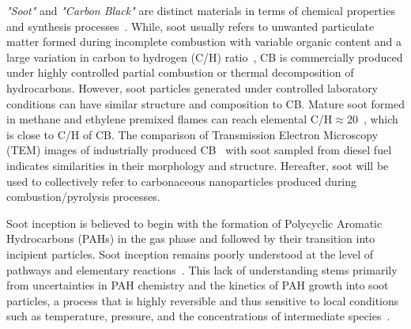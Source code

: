 \textit{"Soot"} and \textit{"Carbon Black"} are distinct materials in terms of chemical properties and synthesis processes~\cite{watson2001carbon}. While, soot usually refers to unwanted particulate matter formed during incomplete combustion with variable organic content and a large variation in carbon to hydrogen (C/H) ratio~\citep{watson2001carbon}, CB is commercially produced under highly controlled partial combustion or thermal decomposition of hydrocarbons. However, soot particles generated under controlled laboratory conditions can have similar structure and composition to CB. Mature soot formed in methane and ethylene premixed flames can reach elemental C/H$\approx$20~\cite{russo2015dehydrogenation}, which is close to C/H of CB. The comparison of Transmission Electron Microscopy (TEM) images of industrially produced CB~\citep{singh2018nanostructure} with soot sampled from diesel fuel~\citep{vander2007hrtem, lapuerta2017morphological} indicates similarities in their morphology and structure. Hereafter, soot will be used to collectively refer to carbonaceous nanoparticles produced during combustion/pyrolysis processes.


Soot inception is believed to begin with the formation of Polycyclic Aromatic Hydrocarbons (PAHs) in the gas phase and followed by their transition into incipient particles. Soot inception remains poorly understood at the level of pathways and elementary reactions~\citep{Wang2011}. This lack of understanding stems primarily from uncertainties in PAH chemistry and the kinetics of PAH growth into soot particles, a process that is highly reversible and thus sensitive to local conditions such as temperature, pressure, and the concentrations of intermediate species~\citep{Wang2011}.


